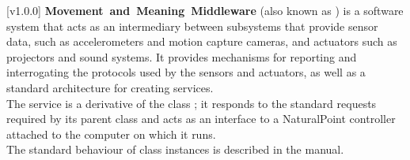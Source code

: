 [v1.0.0]
\textbf{Movement~and~Meaning~Middleware} (also known as \mplusm{}) is a software system
that acts as an intermediary between subsystems that provide sensor data, such as
accelerometers and motion capture cameras, and actuators such as projectors and sound
systems.
It provides mechanisms for reporting and interrogating the protocols used by the sensors
and actuators, as well as a standard architecture for creating services.\\

The \NPI{} service is a derivative of the \mplusm{} class ;
it responds to the standard requests required by its parent class and acts as an interface
to a NaturalPoint controller attached to the computer on which it runs.\\

The standard behaviour of  class instances is described in
the \emph{\MMM} manual.
\primaryEnd{}
